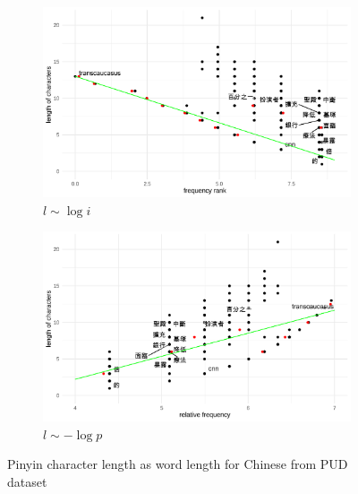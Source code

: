 \begin{figure}[H]
  \centering
  \begin{subfigure}[b]{0.48\textwidth}
    \centering
    \includegraphics[width=\textwidth]{plots/Chinese_logi_cl_PUD_pinyin.pdf}
    \caption{$l \sim \log i$}
  \end{subfigure}
  \hfill
  \begin{subfigure}[b]{0.48\textwidth}
    \centering
    \includegraphics[width=\textwidth]{plots/Chinese_logp_cl_PUD_pinyin.pdf}
    \caption{$l \sim -\log p$}
  \end{subfigure}
  \caption{Pinyin character length as word length for Chinese from PUD dataset}
\end{figure}
